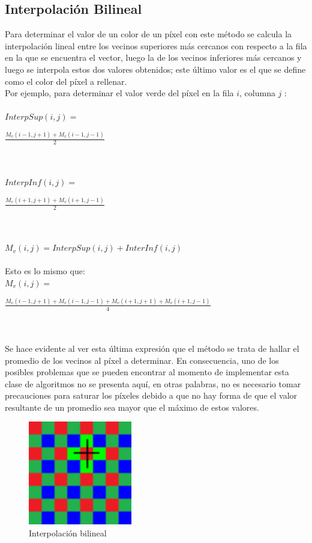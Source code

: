 \documentclass[a4paper]{article}
\begin{document}
\subsection {Interpolación Bilineal}

Para determinar el valor de un color de un píxel con este método se calcula la interpolación lineal entre los vecinos superiores más cercanos con respecto a la fila en la que se encuentra el vector, luego la de los vecinos inferiores  más cercanos y luego se interpola estos dos valores obtenidos; este último valor es el que se define como el color del píxel a rellenar.\\
Por ejemplo, para determinar el valor verde del píxel en la fila $i$, columna $j$ :\\ \\

\noindent $InterpSup(i,j)= $\begin{Large} $\frac{M_{v}(i-1,j+1) + M_{v}(i-1,j-1)}{2}$\end{Large}\\ \\
$InterpInf(i,j)= $\begin{Large} $\frac{M_{v}(i+1,j+1) + M_{v}(i+1,j-1)}{2}$ \end{Large}\\ \\

$ M_{v}(i,j) = InterpSup(i,j) + InterInf(i,j)$\\ \\

Esto es lo mismo que:\\ 
$ M_{v}(i,j) =$\begin{Large} $\frac{M_{v}(i-1,j+1) + M_{v}(i-1,j-1) + M_{v}(i+1,j+1) + M_{v}(i+1,j-1)}{4}$ \end{Large}\\ \\

Se hace evidente al ver esta última expresión que el método se trata de hallar el promedio de los vecinos al píxel a determinar. En consecuencia, uno de los posibles problemas que se pueden encontrar al momento de implementar esta clase de algoritmos no se presenta aquí, en otras palabras, no es necesario tomar precauciones para saturar los píxeles debido a que no hay forma de que el valor resultante de un promedio sea mayor que el máximo de estos valores.

\begin{figure}[htbp]
\centering
\includegraphics[width=128pt]{img/BA1.png}       %
\caption{Interpolación bilineal}
\end{figure}
\end{document}
